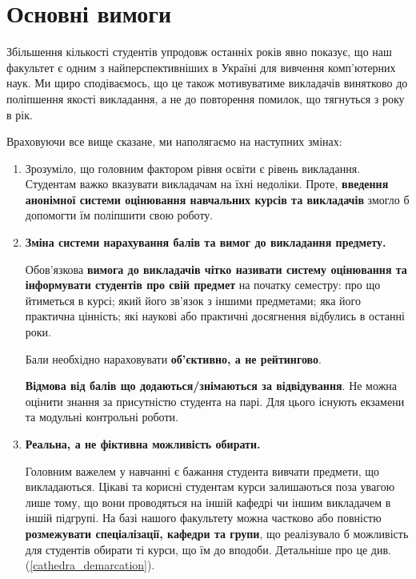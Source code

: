\documentclass[14pt, a4paper]{extarticle}  %
\begin{document}
\newpage

\section{Основні вимоги}
Збільшення кількості студентів упродовж останніх років явно показує, що наш факультет є одним з найперспективніших в Україні для вивчення комп'ютерних наук. Ми щиро сподіваємось, що це також мотивуватиме викладачів винятково до поліпшення якості викладання, а не до повторення помилок, що тягнуться з року в рік. 

Враховуючи все вище сказане, ми наполягаємо на наступних змінах:
\begin{enumerate}
    \item  
    Зрозуміло, що головним фактором рівня освіти є рівень викладання. Студентам важко вказувати викладачам на їхні недоліки. Проте, \textbf{ введення анонімної системи оцінювання навчальних курсів та викладачів} змогло б допомогти їм поліпшити свою роботу. 
    
    \item  \textbf{Зміна системи нарахування балів та вимог до викладання предмету.}
    
    Обов'язкова \textbf{вимога до викладачів чітко називати систему оцінювання та інформувати студентів про свій предмет} на початку семестру: про що йтиметься в курсі; який його зв'язок з іншими предметами; яка його практична цінність; які наукові або практичні досягнення відбулись в останні роки.
    
    Бали необхідно нараховувати \textbf{об'єктивно, а не рейтингово}. 
    
    \textbf{Відмова від балів що додаються/знімаються за відвідування}. Не можна оцінити знання за присутністю студента на парі. Для цього існують екзамени та модульні контрольні роботи.
    
    \item \textbf{Реальна, а не фіктивна можливість обирати.} 
    
    Головним важелем у навчанні є бажання студента вивчати предмети, що викладаються. Цікаві та корисні студентам курси залишаються поза увагою лише тому, що вони проводяться на іншій кафедрі чи іншим викладачем в іншій підгрупі. На базі нашого факультету можна частково або повністю \textbf{розмежувати спеціалізації, кафедри та групи}, що реалізувало б можливість для студентів обирати ті курси, що їм до вподоби. Детальніше про це див. (\ref{cathedra_demarcation}). 
\end{enumerate}
\end{document}
